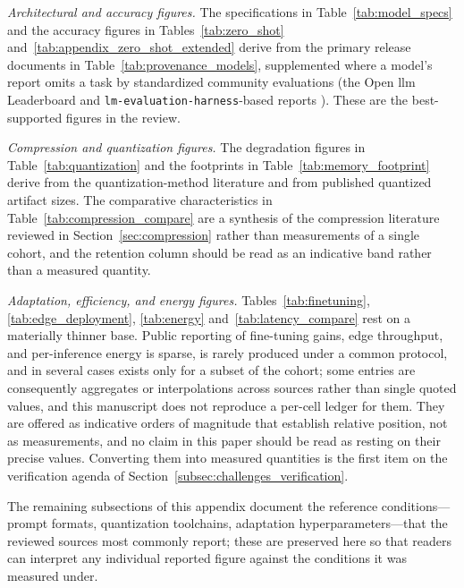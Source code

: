 \emph{Architectural and accuracy figures.} The specifications in
Table~\ref{tab:model_specs} and the accuracy figures in
Tables~\ref{tab:zero_shot} and~\ref{tab:appendix_zero_shot_extended} derive from
the primary release documents in Table~\ref{tab:provenance_models}, supplemented
where a model's report omits a task by standardized community evaluations
(the Open \gls{llm} Leaderboard and \texttt{lm-evaluation-harness}-based reports
\citep{gao2023harness}). These are the best-supported figures in the review.

\emph{Compression and quantization figures.} The degradation figures in
Table~\ref{tab:quantization} and the footprints in
Table~\ref{tab:memory_footprint} derive from the quantization-method literature
\citep{frantar2023gptq,lin2024awq,kim2024squeezellm} and from published
quantized artifact sizes. The comparative characteristics in
Table~\ref{tab:compression_compare} are a synthesis of the compression
literature reviewed in Section~\ref{sec:compression} rather than measurements of
a single cohort, and the retention column should be read as an indicative band
rather than a measured quantity.

\emph{Adaptation, efficiency, and energy figures.} Tables~\ref{tab:finetuning},
\ref{tab:edge_deployment}, \ref{tab:energy} and~\ref{tab:latency_compare} rest on
a materially thinner base. Public reporting of fine-tuning gains, edge
throughput, and per-inference energy is sparse, is rarely produced under a common
protocol, and in several cases exists only for a subset of the cohort; some
entries are consequently aggregates or interpolations across sources rather than
single quoted values, and this manuscript does not reproduce a per-cell ledger
for them. They are offered as indicative orders of magnitude that establish
relative position, not as measurements, and no claim in this paper should be
read as resting on their precise values. Converting them into measured
quantities is the first item on the verification agenda of
Section~\ref{subsec:challenges_verification}.

The remaining subsections of this appendix document the reference conditions---prompt formats, quantization toolchains, adaptation hyperparameters---that the reviewed sources most commonly report; these are preserved here so that readers can interpret any individual reported figure against the conditions it was measured under.

